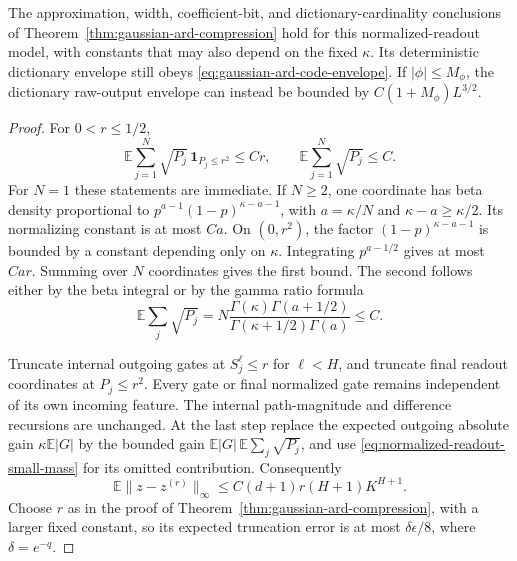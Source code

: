 \begin{corollary}
\label{cor:normalized-readout-compression}
The approximation, width, coefficient-bit, and dictionary-cardinality conclusions of Theorem~\ref{thm:gaussian-ard-compression} hold for this normalized-readout model, with constants that may also depend on the fixed $\kappa$. Its deterministic dictionary envelope still obeys \eqref{eq:gaussian-ard-code-envelope}. If $|\phi|\le M_\phi$, the dictionary raw-output envelope can instead be bounded by $C(1+M_\phi)L^{3/2}$.
\end{corollary}
\begin{proof}
For $0<r\le1/2$,
\begin{equation}
 \mathbb E\sum_{j=1}^N\sqrt{P_j}\,\mathbf1_{P_j\le r^2}\le Cr,
 \qquad
 \mathbb E\sum_{j=1}^N\sqrt{P_j}\le C.
 \label{eq:normalized-readout-small-mass}
\end{equation}
For $N=1$ these statements are immediate. If $N\ge2$, one coordinate has beta density proportional to
$p^{a-1}(1-p)^{\kappa-a-1}$, with $a=\kappa/N$ and $\kappa-a\ge\kappa/2$. Its normalizing constant is at most $Ca$. On $(0,r^2)$, the factor $(1-p)^{\kappa-a-1}$ is bounded by a constant depending only on $\kappa$. Integrating $p^{a-1/2}$ gives at most $Ca r$. Summing over $N$ coordinates gives the first bound. The second follows either by the beta integral or by the gamma ratio formula
\[
 \mathbb E\sum_j\sqrt{P_j}
 =N\frac{\Gamma(\kappa)\Gamma(a+1/2)}
             {\Gamma(\kappa+1/2)\Gamma(a)}\le C.
\]

Truncate internal outgoing gates at $S_j^\ell\le r$ for $\ell<H$, and truncate final readout coordinates at $P_j\le r^2$. Every gate or final normalized gate remains independent of its own incoming feature. The internal path-magnitude and difference recursions are unchanged. At the last step replace the expected outgoing absolute gain $\kappa\mathbb E|G|$ by the bounded gain $\mathbb E|G|\,\mathbb E\sum_j\sqrt{P_j}$, and use \eqref{eq:normalized-readout-small-mass} for its omitted contribution. Consequently
\[
 \mathbb E\|z-z^{(r)}\|_\infty
 \le C(d+1)r(H+1)K^{H+1}.
\]
Choose $r$ as in the proof of Theorem~\ref{thm:gaussian-ard-compression}, with a larger fixed constant, so its expected truncation error is at most $\delta\epsilon/8$, where $\delta=e^{-q}$.


\end{proof}
